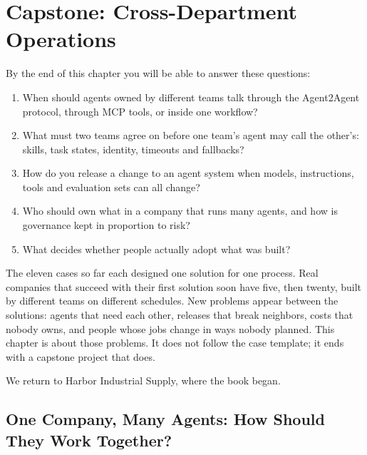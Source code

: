 
\chapter{Capstone: Cross-Department Operations}
\label{ch:capstone}

\begin{chapterquestions}
By the end of this chapter you will be able to answer these questions:
\begin{enumerate}[leftmargin=*,itemsep=2pt]
  \item When should agents owned by different teams talk through the Agent2Agent protocol, through MCP tools, or inside one workflow?
  \item What must two teams agree on before one team's agent may call the other's: skills, task states, identity, timeouts and fallbacks?
  \item How do you release a change to an agent system when models, instructions, tools and evaluation sets can all change?
  \item Who should own what in a company that runs many agents, and how is governance kept in proportion to risk?
  \item What decides whether people actually adopt what was built?
\end{enumerate}
\end{chapterquestions}

The eleven cases so far each designed one solution for one process. Real companies that succeed with their first solution soon have five, then twenty, built by different teams on different schedules. New problems appear between the solutions: agents that need each other, releases that break neighbors, costs that nobody owns, and people whose jobs change in ways nobody planned. This chapter is about those problems. It does not follow the case template; it ends with a capstone project that does.

We return to Harbor Industrial Supply, where the book began.

\section{One Company, Many Agents: How Should They Work Together?}
\label{sec:cap-company}

